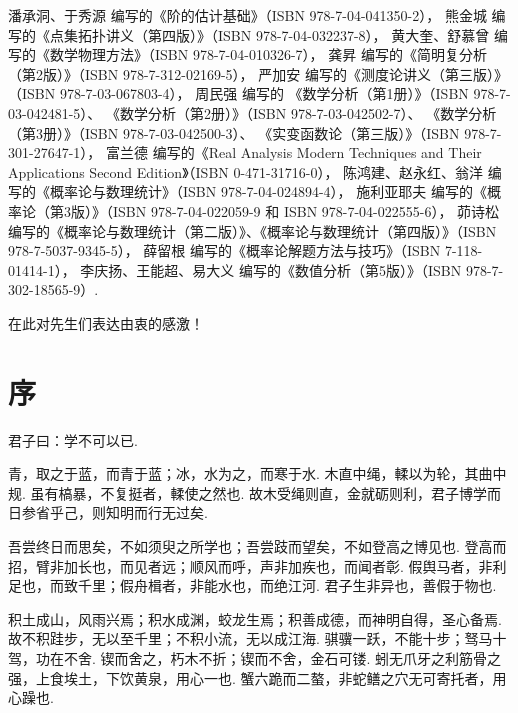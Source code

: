 潘承洞、于秀源 编写的《阶的估计基础》（ISBN 978-7-04-041350-2），
熊金城 编写的《点集拓扑讲义（第四版）》（ISBN 978-7-04-032237-8），
黄大奎、舒慕曾 编写的《数学物理方法》（ISBN 978-7-04-010326-7），
龚昇 编写的《简明复分析（第2版）》（ISBN 978-7-312-02169-5），
严加安 编写的《测度论讲义（第三版）》（ISBN 978-7-03-067803-4），
周民强 编写的
《数学分析（第1册）》（ISBN 978-7-03-042481-5）、
《数学分析（第2册）》（ISBN 978-7-03-042502-7）、
《数学分析（第3册）》（ISBN 978-7-03-042500-3）、
《实变函数论（第三版）》（ISBN 978-7-301-27647-1），
富兰德 编写的《Real Analysis Modern Techniques and Their Applications Second Edition》（ISBN 0-471-31716-0），
陈鸿建、赵永红、翁洋 编写的《概率论与数理统计》（ISBN 978-7-04-024894-4），
施利亚耶夫 编写的《概率论（第3版）》（ISBN 978-7-04-022059-9 和 ISBN 978-7-04-022555-6），
茆诗松 编写的《概率论与数理统计（第二版）》、《概率论与数理统计（第四版）》（ISBN 978-7-5037-9345-5），
薛留根 编写的《概率论解题方法与技巧》（ISBN 7-118-01414-1），
李庆扬、王能超、易大义 编写的《数值分析（第5版）》（ISBN 978-7-302-18565-9）.

在此对先生们表达由衷的感激！

\cleardoublepage
\chapter*{序}
君子曰：学不可以已.

青，取之于蓝，而青于蓝；冰，水为之，而寒于水.
木直中绳，輮以为轮，其曲中规.
虽有槁暴，不复挺者，輮使之然也.
故木受绳则直，金就砺则利，君子博学而日参省乎己，则知明而行无过矣.

吾尝终日而思矣，不如须臾之所学也；吾尝跂而望矣，不如登高之博见也.
登高而招，臂非加长也，而见者远；顺风而呼，声非加疾也，而闻者彰.
假舆马者，非利足也，而致千里；假舟楫者，非能水也，而绝江河.
君子生非异也，善假于物也.

积土成山，风雨兴焉；积水成渊，蛟龙生焉；积善成德，而神明自得，圣心备焉.
故不积跬步，无以至千里；不积小流，无以成江海.
骐骥一跃，不能十步；驽马十驾，功在不舍.
锲而舍之，朽木不折；锲而不舍，金石可镂.
蚓无爪牙之利筋骨之强，上食埃土，下饮黄泉，用心一也.
蟹六跪而二螯，非蛇鳝之穴无可寄托者，用心躁也.
